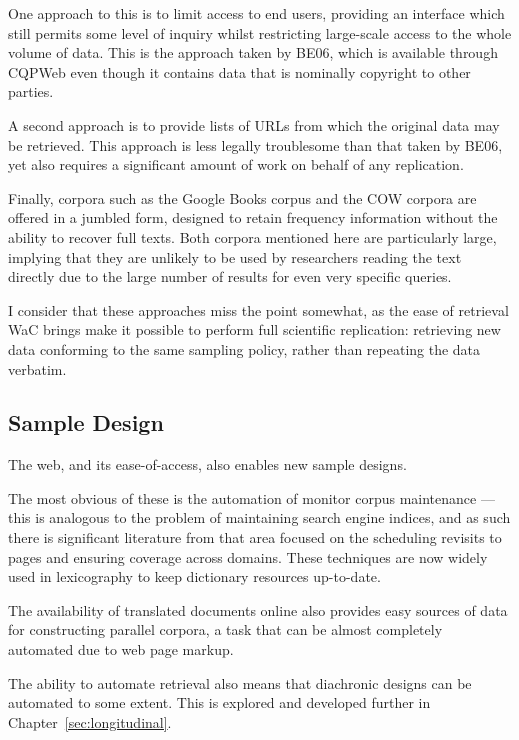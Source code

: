 One approach to this is to limit access to end users, providing an interface which still permits some level of inquiry whilst restricting large-scale access to the whole volume of data.  This is the approach taken by BE06\cite{baker2009be06}, which is available through CQPWeb even though it contains data that is nominally copyright to other parties.

A second approach is to provide lists of URLs from which the original data may be retrieved.  This approach is less legally troublesome than that taken by BE06, yet also requires a significant amount of work on behalf of any replication.

Finally, corpora such as the Google Books corpus\cite{goldberg2013dataset} and the COW corpora\cite{schafer2012building} are offered in a jumbled form, designed to retain frequency information without the ability to recover full texts.  Both corpora mentioned here are particularly large, implying that they are unlikely to be used by researchers reading the text directly due to the large number of results for even very specific queries.


I consider that these approaches miss the point somewhat, as the ease of retrieval WaC brings make it possible to perform full scientific replication: retrieving new data conforming to the same sampling policy, rather than repeating the data verbatim.



\subsection{Sample Design}
The web, and its ease-of-access, also enables new sample designs.

The most obvious of these is the automation of monitor corpus maintenance --- this is analogous to the problem of maintaining search engine indices, and as such there is significant literature from that area focused on the scheduling revisits to pages and ensuring coverage across domains.  These techniques are now widely used in lexicography to keep dictionary resources up-to-date.

The availability of translated documents online also provides easy sources of data for constructing parallel corpora, a task that can be almost completely automated due to web page markup\cite{resnik2003web}.

The ability to automate retrieval also means that diachronic designs can be automated to some extent.  This is explored and developed further in Chapter~\ref{sec:longitudinal}.

